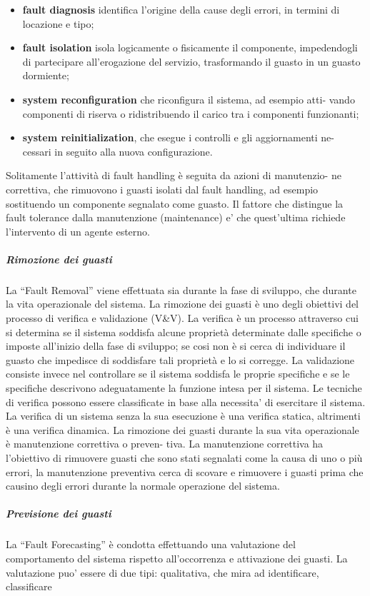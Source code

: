 \documentclass[14pt]{extarticle}
\begin{document}
\begin{itemize}
\item \textbf{fault diagnosis} identifica l’origine della cause degli errori, in termini di
locazione e tipo;
\item \textbf{fault isolation} isola logicamente o fisicamente il componente, impedendogli di partecipare all’erogazione del servizio, trasformando il guasto in
un guasto dormiente;
\item \textbf{system reconfiguration} che riconfigura il sistema, ad esempio atti-
vando componenti di riserva o ridistribuendo il carico tra i componenti
funzionanti;
\item \textbf{system reinitialization}, che esegue i controlli e gli aggiornamenti ne-
cessari in seguito alla nuova configurazione.

\end{itemize}
Solitamente l’attività di fault handling è seguita da azioni di manutenzio-
ne correttiva, che rimuovono i guasti isolati dal fault handling, ad esempio
sostituendo un componente segnalato come guasto. Il fattore che distingue la
fault tolerance dalla manutenzione (maintenance) e’ che quest’ultima richiede
l’intervento di un agente esterno.
\subparagraph{Rimozione dei guasti}
La “Fault Removal” viene effettuata sia durante la fase di sviluppo, che durante la vita operazionale del sistema.
La rimozione dei guasti è uno degli obiettivi del processo di verifica e validazione (V\&V).
La verifica è un processo attraverso cui si determina se il sistema soddisfa alcune proprietà determinate dalle
specifiche o imposte all’inizio della fase di sviluppo; se cosi non è si cerca di
individuare il guasto che impedisce di soddisfare tali proprietà e lo si corregge.
La validazione consiste invece nel controllare se il sistema soddisfa le proprie
specifiche e se le specifiche descrivono adeguatamente la funzione intesa per il
sistema. Le tecniche di verifica possono essere classificate in base alla necessita’ di esercitare il sistema. La verifica di un sistema senza la sua esecuzione
è una verifica statica, altrimenti è una verifica dinamica. La rimozione dei
guasti durante la sua vita operazionale è manutenzione correttiva o preven-
tiva. La manutenzione correttiva ha l’obiettivo di rimuovere guasti che sono
stati segnalati come la causa di uno o più errori, la manutenzione preventiva
cerca di scovare e rimuovere i guasti prima che causino degli errori durante la
normale operazione del sistema.
\subparagraph{Previsione dei guasti}
La “Fault Forecasting” è condotta effettuando una valutazione del comportamento del sistema rispetto all’occorrenza e attivazione dei guasti. La valutazione puo’ essere di due tipi: qualitativa, che mira ad identificare, classificare
\end{document}
